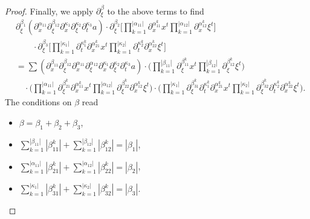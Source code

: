\documentclass[10pt,a4paper]{amsart}
\begin{document}
\begin{proof}
Finally, we apply $\partial_{\xi}^{\beta}$ to the above terms to find
\begin{equation*}
\begin{split}
&\partial_{\xi}^{\beta_1} (\partial_x^{\alpha_{11}} \partial_{\xi}^{\beta_{12}} \partial_x^{\kappa_1} \partial_{\xi}^{\kappa_2} \partial_t^{\kappa_3}  a) \cdot \partial_{\xi}^{\beta_2} \big[ \prod_{k=1}^{|\alpha_{11}|} \partial_x^{\alpha_{11}^k} x^t \prod_{k=1}^{|\alpha_{12}|} \partial_x^{\alpha_{12}^k} \xi^t \big] \\
&\quad \quad \cdot \partial_{\xi}^{\beta_3} \big[ \prod_{k=1}^{|\kappa_1|} \partial_t^{\kappa_1^k} \partial_x^{\alpha_{21}^k} x^t \prod_{k=1}^{|\kappa_2|} \partial_t^{\kappa_2^k} \partial_x^{\alpha_{22}^k} \xi^t \big] \\
&= \sum (\partial_x^{\beta_{11}} \partial_{\xi}^{\beta_{12}} \partial_x^{\alpha_{11}} \partial_{\xi}^{\alpha_{12}} \partial_x^{\kappa_1} \partial_{\xi}^{\kappa_2} \partial_t^{\kappa_3} a) \cdot \big( \prod_{k=1}^{|\beta_{11}|} \partial_{\xi}^{\beta_{11}^k} x^t \prod_{k=1}^{|\beta_{12}|} \partial_{\xi}^{\beta_{12}^k} \xi^t \big) \\
&\quad \cdot \big( \prod_{k=1}^{|\alpha_{11}|} \partial_{\xi}^{\beta_{21}^k} \partial_{x}^{\alpha_{11}^k} x^t \prod_{k=1}^{|\alpha_{12}|} \partial_{\xi}^{\beta_{22}^k} \partial_x^{\alpha_{12}^k} \xi^t \big) \cdot \big( \prod_{k=1}^{|\kappa_1|} \partial_{\xi}^{\beta_{31}^k} \partial_t^{\kappa_1^k} \partial_x^{\alpha_{21}^k} x^t \prod_{k=1}^{|\kappa_2|} \partial_{\xi}^{\beta_{32}^k} \partial_t^{\kappa_2^k} \partial_x^{\alpha_{22}^k} \xi^t \big).
\end{split}
\end{equation*}
The conditions on $\beta$ read
\begin{itemize}
\item $\beta = \beta_1 + \beta_2 + \beta_3$, 
\item $\sum_{k=1}^{|\beta_{11}|} |\beta_{11}^k| + \sum_{k=1}^{|\beta_{12}|} |\beta_{12}^k| = |\beta_1|$, 
\item $\sum_{k=1}^{|\alpha_{11}|} |\beta_{21}^k| + \sum_{k=1}^{|\alpha_{12}|} |\beta_{22}^k| = |\beta_2|$, 
\item $\sum_{k=1}^{|\kappa_1|} |\beta_{31}^k| + \sum_{k=1}^{|\kappa_2|} |\beta_{32}^k| = |\beta_{3}|$.
\end{itemize}


\end{proof}
\end{document}
